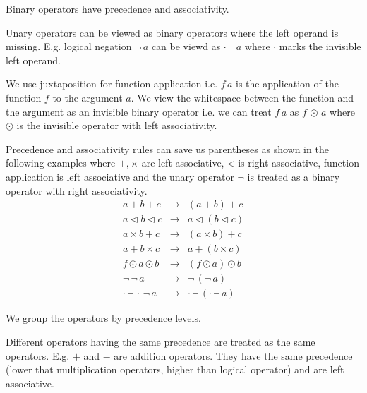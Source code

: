 Binary operators have precedence and associativity.

Unary operators can be viewed as binary operators where the left operand is
missing. E.g. logical negation $\lnot\, a$ can be viewd as $\cdot\, \lnot\, a$
where $\cdot$ marks the invisible left operand.

We use juxtaposition for function application i.e. $f \, a$ is the
application of the function $f$ to the argument $a$. We view the whitespace
between the function and the argument as an invisible binary operator i.e. we
can treat $f \, a$ as $f \, \odot\, a$ where $\odot$ is the invisible operator
with left associativity.



Precedence and associativity rules can save us parentheses as shown in the
following examples where $+,\times$ are left associative, $\triangleleft$ is
right associative, function application is left associative and the unary
operator $\lnot$ is treated as a binary operator with right associativity.
%
$$
\begin{array}{lll}
  a + b + c
  &  \to
  &   (a + b) + c

  \\

  a \triangleleft b \triangleleft c
  &  \to
  & a \triangleleft (b \triangleleft c)

  \\

  a \times b + c
  &  \to
  &   (a \times b) + c

  \\

  a + b \times c
  &  \to
  &   a + (b \times c)

  \\

  f \odot a \odot b & \to & (f \odot a) \odot b

  \\

  \lnot \, \lnot \, a & \to &  \lnot \, (\lnot \, a)

  \\

  \cdot\, \lnot\, \cdot\, \lnot\, a
  & \to
  &  \cdot\, \lnot\, (\cdot\, \lnot\, a)
\end{array}
$$


We group the operators by precedence levels.

Different operators having the same precedence are treated as the same
operators. E.g. $+$ and $-$ are addition operators. They have the same
precedence (lower that multiplication operators, higher than logical operator)
and are left associative.


